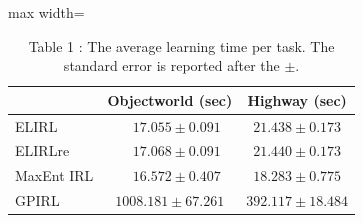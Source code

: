 \documentclass[varwidth=598pt]{standalone}
\begin{document}
\begin{table}
\centering
\begin{adjustbox}{max width=\textwidth}
        \begin{tabular}{l|c|c}
             & Objectworld (sec)  & Highway (sec)\\
            \hline
             ELIRL & \ \ $17.055\pm0.091$ & $21.438\pm0.173$\\
             ELIRLre & \ \ $17.068\pm0.091$ & $21.440\pm0.173$\\
             MaxEnt IRL & \ \ $16.572\pm0.407$ & $18.283\pm0.775$ \\
             GPIRL &  $1008.181\pm67.261$ & $392.117\pm18.484$\\
        \end{tabular}
\end{adjustbox}
\caption{Table 1 : The average learning time per task. The standard error is reported after the $\pm$.}
\end{table}
\end{document}
